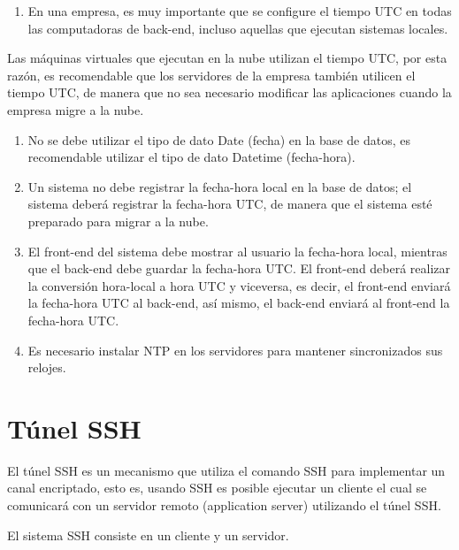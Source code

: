 \begin{enumerate}

\item En una empresa, es muy importante que se configure el tiempo UTC en todas las computadoras de back-end, incluso aquellas que ejecutan sistemas locales.

\end{enumerate}

Las máquinas virtuales que ejecutan en la nube utilizan el tiempo UTC, por esta razón, es recomendable que los servidores de la empresa también utilicen el tiempo UTC, de manera que no sea necesario modificar las aplicaciones cuando la empresa migre a la nube.

\begin{enumerate}

\item No se debe utilizar el tipo de dato Date (fecha) en la base de datos, es recomendable utilizar el tipo de dato Datetime (fecha-hora).

\item Un sistema no debe registrar la fecha-hora local en la base de datos; el sistema deberá registrar la fecha-hora UTC, de manera que el sistema esté preparado para migrar a la nube.

\item El front-end del sistema debe mostrar al usuario la fecha-hora local, mientras que el back-end debe guardar la fecha-hora UTC. El front-end deberá realizar la conversión hora-local a hora UTC y viceversa, es decir, el front-end enviará la fecha-hora UTC al back-end, así mismo, el back-end enviará al front-end la fecha-hora UTC.

\item Es necesario instalar NTP en los servidores para mantener sincronizados sus relojes.

\end{enumerate}

\chapter{Túnel SSH}

El túnel SSH es un mecanismo que utiliza el comando SSH para implementar un canal encriptado, esto es, usando SSH es posible ejecutar un cliente el cual se comunicará con un servidor remoto (application server) utilizando el túnel SSH.

El sistema SSH consiste en un cliente y un servidor.

